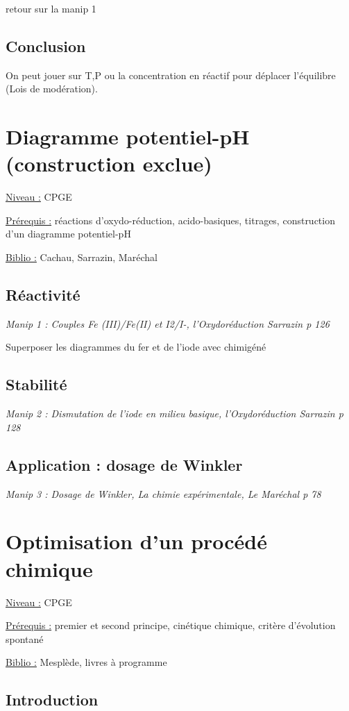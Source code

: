 \documentclass{article}%
\begin{document}
retour sur la manip 1

\subsection{Conclusion}

On peut jouer sur T,P ou la concentration en réactif pour déplacer l'équilibre (Lois de modération).

\section{Diagramme potentiel-pH (construction exclue)}
\underline{Niveau :} CPGE 

\underline{Prérequis :} réactions d'oxydo-réduction, acido-basiques, titrages, construction d'un diagramme potentiel-pH

\underline{Biblio :} Cachau, Sarrazin, Maréchal

\subsection{Réactivité}
\textit{Manip 1 : Couples Fe (III)/Fe(II) et I2/I-, l'Oxydoréduction Sarrazin p 126}

Superposer les diagrammes du fer et de l'iode avec chimigéné
\subsection{Stabilité}
\textit{Manip 2 : Dismutation de l'iode en milieu basique, l'Oxydoréduction Sarrazin p 128}
\subsection{Application : dosage de Winkler}
\textit{Manip 3 : Dosage de Winkler, La chimie expérimentale, Le Maréchal p 78}
\section{Optimisation d'un procédé chimique}
\underline{Niveau :} CPGE 

\underline{Prérequis :} premier et second principe, cinétique chimique, critère d'évolution spontané

\underline{Biblio :} Mesplède, livres à programme

\subsection{Introduction}
\end{document}
